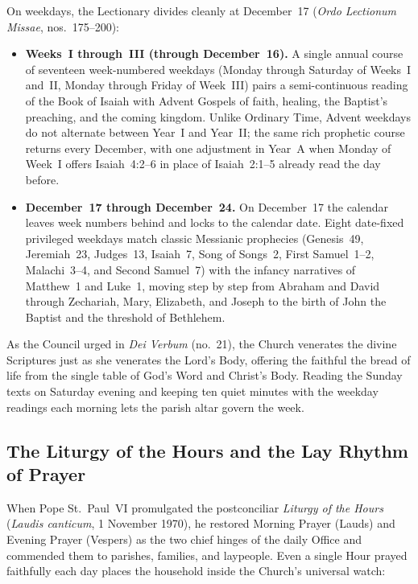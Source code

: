 On weekdays, the Lectionary divides cleanly at December~17 (\textit{Ordo Lectionum Missae}, nos.~175--200):

\begin{itemize}
  \item \textbf{Weeks~I through~III (through December~16).} A single annual course of seventeen week-numbered weekdays (Monday through Saturday of Weeks~I and~II, Monday through Friday of Week~III) pairs a semi-continuous reading of the Book of Isaiah with Advent Gospels of faith, healing, the Baptist's preaching, and the coming kingdom. Unlike Ordinary Time, Advent weekdays do not alternate between Year~I and Year~II; the same rich prophetic course returns every December, with one adjustment in Year~A when Monday of Week~I offers Isaiah~4:2--6 in place of Isaiah~2:1--5 already read the day before.
  \item \textbf{December~17 through December~24.} On December~17 the calendar leaves week numbers behind and locks to the calendar date. Eight date-fixed privileged weekdays match classic Messianic prophecies (Genesis~49, Jeremiah~23, Judges~13, Isaiah~7, Song of Songs~2, First Samuel~1--2, Malachi~3--4, and Second Samuel~7) with the infancy narratives of Matthew~1 and Luke~1, moving step by step from Abraham and David through Zechariah, Mary, Elizabeth, and Joseph to the birth of John the Baptist and the threshold of Bethlehem.
\end{itemize}

As the Council urged in \textit{Dei Verbum} (no.~21), the Church venerates the divine Scriptures just as she venerates the Lord's Body, offering the faithful the bread of life from the single table of God's Word and Christ's Body. Reading the Sunday texts on Saturday evening and keeping ten quiet minutes with the weekday readings each morning lets the parish altar govern the week.

\subsection{The Liturgy of the Hours and the Lay Rhythm of Prayer}

When Pope St.~Paul~VI promulgated the postconciliar \textit{Liturgy of the Hours} (\textit{Laudis canticum}, 1 November 1970), he restored Morning Prayer (Lauds) and Evening Prayer (Vespers) as the two chief hinges of the daily Office and commended them to parishes, families, and laypeople. Even a single Hour prayed faithfully each day places the household inside the Church's universal watch:


